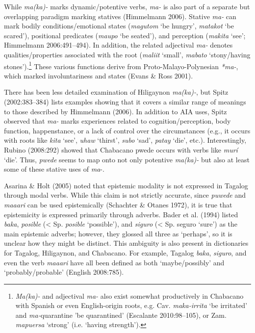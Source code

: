 \begin{styleStandard}
While \textit{ma(ka)-} marks dynamic/potentive verbs, \textit{ma-} is also part of a separate but overlapping paradigm marking statives (Himmelmann 2006). Stative \textit{ma-} can mark bodily conditions/emotional states (\textit{magutom }‘be hungry’, \textit{matakot} ‘be scared’), positional predicates (\textit{maupo} ‘be seated’), and perception (\textit{makita} ‘see’; Himmelmann 2006:491–494). In addition, the related adjectival \textit{ma-} denotes qualities/properties associated with the root (\textit{maliit} ‘small’, \textit{mabato} ‘stony/having stones’).\footnote{\textit{Ma(ka)-} and adjectival \textit{ma-} also exist somewhat productively in Chabacano with Spanish or even English-origin roots, e.g. Cav. \textit{maka-irrita} ‘be irritated’ and \textit{ma-}quarantine 'be quarantined' (Escalante 2010:98–105), or Zam. \textit{mapuersa }‘strong’ (i.e. ‘having strength’). } These various functions derive from Proto-Malayo-Polynesian \textit{*ma-}, which marked involuntariness and states (Evans \& Ross 2001).
\end{styleStandard}

\begin{styleStandard}
There has been less detailed examination of Hiligaynon \textit{ma(ka)-}, but Spitz (2002:383–384) lists examples showing that it covers a similar range of meanings to those described by Himmelmann (2006). In addition to AIA uses, Spitz observed that \textit{ma-} marks experiences related to cognition/perception, body function, happenstance, or a lack of control over the circumstances (e.g., it occurs with roots like \textit{kita} ‘see’, \textit{uhaw} ‘thirst’, \textit{subo} ‘sad’, \textit{patay} ‘die’, etc.). Interestingly, Rubino (2008:292) showed that Chabacano pwede occurs with verbs like \textit{murí} ‘die’. Thus, \textit{pwede} seems to map onto not only potentive \textit{ma(ka)-} but also at least some of these stative uses of \textit{ma}{}-.
\end{styleStandard}

\begin{styleStandard}
Asarina \& Holt (2005) noted that epistemic modality is not expressed in Tagalog through modal verbs. While this claim is not strictly accurate, since \textit{puwede} and \textit{maaari} can be used epistemically (Schachter \& Otanes 1972), it is true that epistemicity is expressed primarily through adverbs. Bader et al. (1994) listed \textit{baka}, \textit{posible} ({\textless} Sp. \textit{posible} ‘possible’), and \textit{siguro} ({\textless} Sp. seguro ‘sure’) as the main epistemic adverbs; however, they glossed all three as ‘perhaps’, so it is unclear how they might be distinct. This ambiguity is also present in dictionaries for Tagalog, Hiligaynon, and Chabacano. For example, Tagalog \textit{baka}, \textit{siguro}, and even the verb \textit{maaari} have all been defined as both ‘maybe/possibly’ and ‘probably/probable’ (English 2008:785).
\end{styleStandard}


